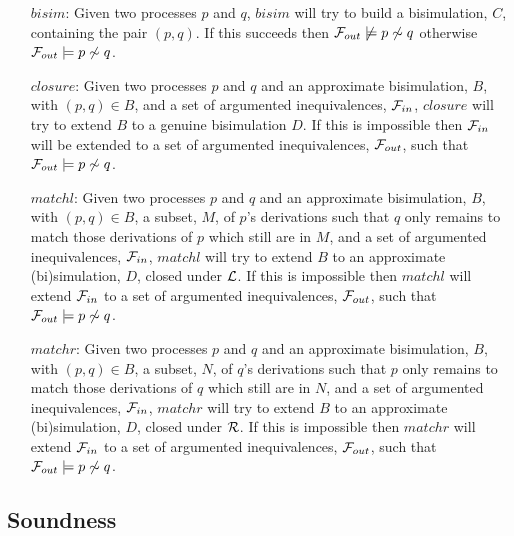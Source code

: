 \begin{itemize}
\item[$bisim$:] Given two processes $p$ and $q$, $bisim$ will try to build a bisimulation, $C$, containing the pair $(p,q)$. If this succeeds then ${\cal F}_{out}\not\models p\not\sim q$ otherwise ${\cal F}_{out}\models p\not\sim q$.

\item[$closure$:] Given two processes $p$ and $q$ and an approximate bisimulation, $B$, with $(p,q)\in B$, and a set of argumented inequivalences, ${\cal F}_{in}$, $closure$ will try to extend $B$ to a genuine bisimulation $D$. If this is impossible then ${\cal F}_{in}$ will be extended to a set of argumented inequivalences, ${\cal F}_{out}$, such that ${\cal F}_{out}\models p\not\sim q$.

\item[$matchl$:] Given two processes $p$ and $q$ and an approximate bisimulation, $B$,  with $(p,q)\in B$, a subset, $M$, of $p$'s derivations such that $q$ only remains to match those derivations of $p$ which still are in $M$, and a set of argumented inequivalences, ${\cal F}_{in}$, $matchl$ will try to extend $B$ to an approximate (bi)simulation, $D$, closed under ${\cal L}$. If this is impossible then $matchl$ will extend ${\cal F}_{in}$ to a set of argumented inequivalences, ${\cal F}_{out}$, such that ${\cal F}_{out}\models p\not\sim q$.

\item[$matchr$:] Given two processes $p$ and $q$ and an approximate bisimulation, $B$,  with $(p,q)\in B$, a subset, $N$, of $q$'s derivations such that $p$ only remains to match those derivations of $q$ which still are in $N$, and a set of argumented inequivalences, ${\cal F}_{in}$, $matchr$ will try to extend $B$ to an approximate (bi)simulation, $D$, closed under ${\cal R}$. If this is impossible then $matchr$ will extend ${\cal F}_{in}$ to a set of argumented inequivalences, ${\cal F}_{out}$, such that ${\cal F}_{out}\models p\not\sim q$.

\end{itemize}


\subsection{Soundness}

